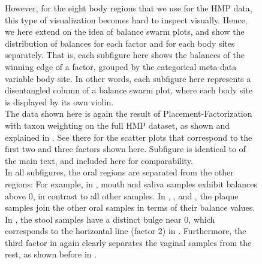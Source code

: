 \begin{figure}[!htb]
{        However, for the eight body regions that we use for the \ac{HMP} data,
        this type of visualization becomes hard to inspect visually.
        Hence, we here extend on the idea of balance swarm plots,
        and show the distribution of balances for each factor and for each body sites separately.
        That is, each subfigure here shows the balances of the winning edge of a factor,
        grouped by the categorical meta-data variable body site.
        In other words, each subfigure here represents a disentangled column of a balance swarm plot,
        where each body site is displayed by its own violin. %
        \\
        The data shown here is again the result of Placement-Factorization with taxon weighting on the full \ac{HMP} dataset,
        as shown and explained in .
        See there for the scatter plots that correspond to the first two and three factors shown here.
        Subfigure  is identical to 
        of the main text, and included here for comparability.
        \\
        In all subfigures, the oral regions are separated from the other regions:
        For example, in ,
        mouth and saliva samples exhibit balances above \num{0}, in contrast to all other samples.
        In , , and
        ,
        the plaque samples join the other oral samples in terms of their balance values.
        In , the stool samples have a distinct bulge near \num{0},
        which corresponds to the horizontal line (factor 2)
        in .
        Furthermore, the third factor in 
        again clearly separates the vaginal samples from the rest,
        as shown before in .
    }
    \label{fig:hmp_pf_all_violins}
\end{figure}


